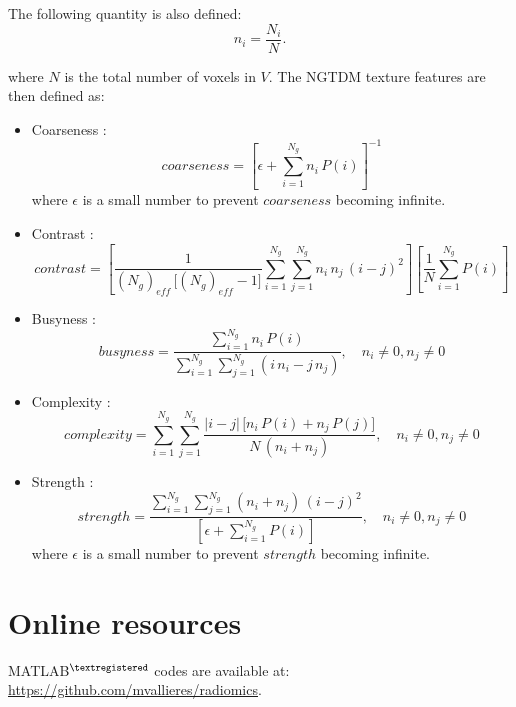\documentclass{article}
\begin{document}
\noindent The following quantity is also defined:
\[n_i = \frac{N_i}{N}.\]

\noindent where $N$ is the total number of voxels in $V$. The NGTDM texture features are then defined as:

\begin{itemize}
	\item Coarseness \cite{AmadasunM1989}:
		  \[coarseness = \left[\epsilon + \sum_{i=1}^{N_g} n_i\,P(i)\right]^{-1}\]
		  where $\epsilon$ is a small number to prevent $coarseness$ becoming infinite.
	\item Contrast \cite{AmadasunM1989}:
		  \[contrast = \left[\frac{1}{(N_g)_{eff}\,\big[(N_g)_{eff}-1\big]}\sum_{i=1}^{N_g}\sum_{j=1}^{N_g} 
		  n_i\,n_j\,(i-j)^2\right]\left[\frac{1}{N}\sum_{i=1}^{N_g} P(i)\right]\]
	\item Busyness \cite{AmadasunM1989}:
		  \[busyness = \frac{\sum_{i=1}^{N_g} n_i\,P(i)}{\sum_{i=1}^{N_g}\sum_{j=1}^{N_g} (i\,n_i - j\,n_j)}, 
		  \quad n_i \neq 0,n_j \neq 0\]
	\item Complexity \cite{AmadasunM1989}:
		  \[complexity = \sum_{i=1}^{N_g}\sum_{j=1}^{N_g} \frac{|i-j|\,\big[n_i\,P(i) + n_j\,P(j)\big]}{N\,(n_i 
		  + n_j)}, \quad n_i \neq 0,n_j \neq 0\]
	\item Strength \cite{AmadasunM1989}:
		  \[strength = \frac{\sum_{i=1}^{N_g}\sum_{j=1}^{N_g} (n_i + n_j)\,(i-j)^2}{\left[\epsilon + 
		  \sum_{i=1}^{N_g} P(i)\right]},  \quad n_i \neq 0,n_j \neq 0\]
		  where $\epsilon$ is a small number to prevent $strength$ becoming infinite.
	\\
\end{itemize}


\section*{Online resources} 
MATLAB$^{\textregistered}$ codes are available at: \url{https://github.com/mvallieres/radiomics}.
\end{document}
